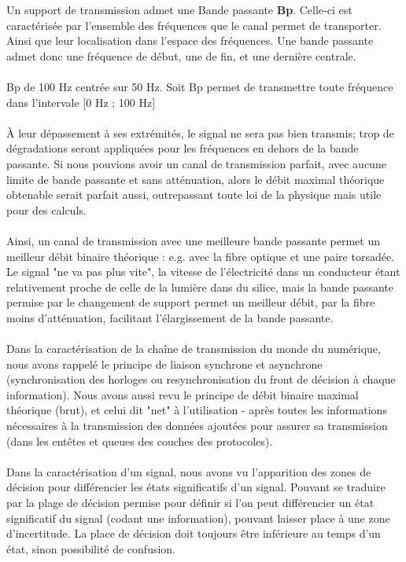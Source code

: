 Un support de transmission admet une Bande passante \textbf{Bp}. Celle-ci est caractérisée par l'ensemble des fréquences que le canal permet de transporter. Ainsi que leur localisation dans l'espace des fréquences. Une bande passante admet donc une fréquence de début, une de fin, et une dernière centrale.
\\ \\
Bp de 100 Hz centrée sur 50 Hz. Soit Bp permet de transmettre toute fréquence dans l'intervale [0 Hz ; 100 Hz]
\\ \\
À leur dépassement à ses extrémités, le signal ne sera pas bien transmis; trop de dégradations seront appliquées pour les fréquences en dehors de la bande passante. Si nous pouvions avoir un canal de transmission parfait, avec aucune limite de bande passante et sans atténuation, alors le débit maximal théorique obtenable serait parfait aussi, outrepassant toute loi de la physique mais utile pour des calculs.
\\ \\
Ainsi, un canal de transmission avec une meilleure bande passante permet un meilleur débit binaire théorique : e.g. avec la fibre optique et une paire torsadée. Le signal "ne va pas plus vite", la vitesse de l'électricité dans un conducteur étant relativement proche de celle de la lumière dans du silice, mais la bande passante permise par le changement de support permet un meilleur débit, par la fibre moins d'atténuation, facilitant l'élargissement de la bande passante.
\\ \\
Dans la caractérisation de la chaîne de transmission du monde du numérique, nous avons rappelé le principe de liaison synchrone et asynchrone (synchronisation des horloges ou resynchronisation du front de décision à chaque information). Nous avons aussi revu le principe de débit binaire maximal théorique (brut), et celui dit "net" à l'utilisation - après toutes les informations nécessaires à la transmission des données ajoutées pour assurer sa transmission (dans les entêtes et queues des couches des protocoles).
\\ \\
Dans la caractérisation d'un signal, nous avons vu l'apparition des zones de décision pour différencier les états significatifs d'un signal. Pouvant se traduire par la plage de décision permise pour définir si l'on peut différencier un état significatif du signal (codant une information), pouvant laisser place à une zone d'incertitude. La place de décision doit toujours être inférieure au temps d'un état, sinon possibilité de confusion.

